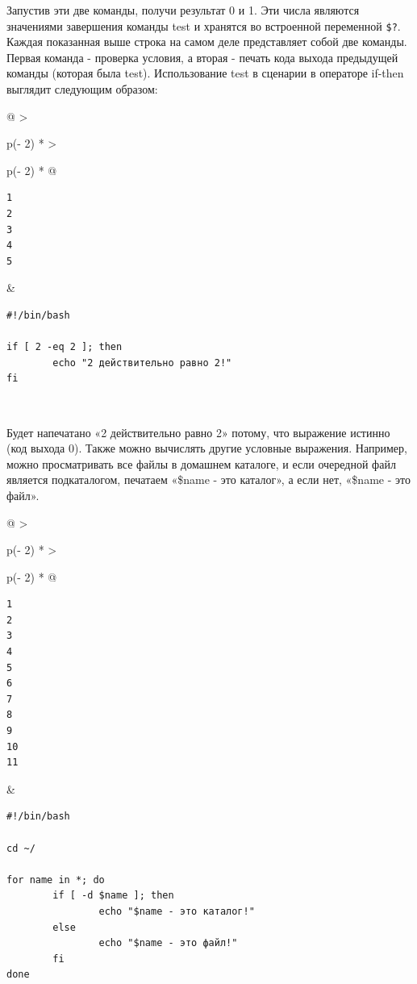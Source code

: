 \documentclass{article}
\begin{document}
Запустив эти две команды, получи результат 0 и 1. Эти числа являются
значениями завершения команды test и хранятся во встроенной переменной
\texttt{\$?}. Каждая показанная выше строка на самом деле представляет
собой две команды. Первая команда - проверка условия, а вторая - печать
кода выхода предыдущей команды (которая была test). Использование test в
сценарии в операторе if-then выглядит следующим образом:

\begin{longtable}[]{@{}
  >{\raggedright\arraybackslash}p{(\columnwidth - 2\tabcolsep) * }
  >{\raggedright\arraybackslash}p{(\columnwidth - 2\tabcolsep) * }@{}}
\toprule
\endhead
\begin{minipage}[t]{\linewidth}\raggedright
\begin{verbatim}
1
2
3
4
5
\end{verbatim}
\end{minipage} & \begin{minipage}[t]{\linewidth}\raggedright
\begin{verbatim}
#!/bin/bash

if [ 2 -eq 2 ]; then
        echo "2 действительно равно 2!"
fi
\end{verbatim}
\end{minipage} \\ \addlinespace
\bottomrule
\end{longtable}

Будет напечатано «2 действительно равно 2» потому, что выражение истинно
(код выхода 0). Также можно вычислять другие условные выражения.
Например, можно просматривать все файлы в домашнем каталоге, и если
очередной файл является подкаталогом, печатаем «\$name - это каталог», а
если нет, «\$name - это файл».

\begin{longtable}[]{@{}
  >{\raggedright\arraybackslash}p{(\columnwidth - 2\tabcolsep) * }
  >{\raggedright\arraybackslash}p{(\columnwidth - 2\tabcolsep) * }@{}}
\toprule
\endhead
\begin{minipage}[t]{\linewidth}\raggedright
\begin{verbatim}
1
2
3
4
5
6
7
8
9
10
11
\end{verbatim}
\end{minipage} & \begin{minipage}[t]{\linewidth}\raggedright
\begin{verbatim}
#!/bin/bash

cd ~/

for name in *; do
        if [ -d $name ]; then
                echo "$name - это каталог!"
        else
                echo "$name - это файл!"
        fi
done
\end{verbatim}
\end{minipage} \\ \addlinespace
\bottomrule
\end{longtable}
\end{document}
